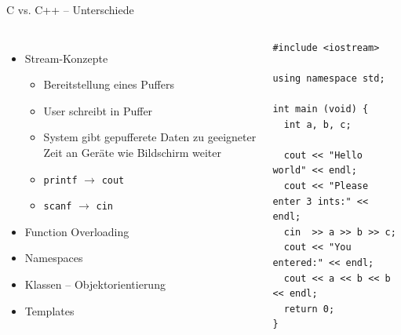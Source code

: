 \begin{frame}[fragile]{C vs. C++ -- Unterschiede}
%
\begin{columns}[T]
\begin{itemize}
\item Stream-Konzepte
	\begin{itemize}
	\item Bereitstellung eines Puffers
	\item User schreibt in Puffer
	\item System gibt gepufferete Daten zu geeigneter Zeit an Geräte wie Bildschirm weiter
	\item \texttt{printf} $\rightarrow$ \texttt{cout}
	\item \texttt{scanf}  $\rightarrow$ \texttt{cin}
	\end{itemize}
\item Function Overloading
\item Namespaces
\item Klassen -- Objektorientierung
\item Templates
\end{itemize}
%
\begin{codebox}
\begin{verbatim}
#include <iostream>

using namespace std;

int main (void) {
  int a, b, c;
  
  cout << "Hello world" << endl;
  cout << "Please enter 3 ints:" << endl;
  cin  >> a >> b >> c;
  cout << "You entered:" << endl;
  cout << a << b << b << endl;
  return 0;
}
\end{verbatim}
\end{codebox}
\end{columns}
%
\end{frame}


